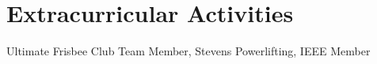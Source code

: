 \documentclass[letterpaper,11pt]{article}
\begin{document}
\section{Extracurricular Activities}
 \begin{itemize}[leftmargin=0.15in, label={}]
    \small{\item{
     Ultimate Frisbee Club Team Member, Stevens Powerlifting, IEEE Member
    }}
 \end{itemize}

\end{document}
